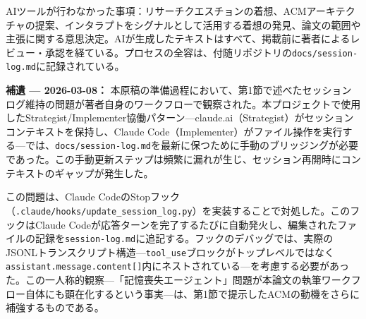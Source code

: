\documentclass[conference]{IEEEtran}
\begin{document}
AIツールが行わなかった事項：リサーチクエスチョンの着想、ACMアーキテクチャの提案、インタラプトをシグナルとして活用する着想の発見、論文の範囲や主張に関する意思決定。AIが生成したテキストはすべて、掲載前に著者によるレビュー・承認を経ている。プロセスの全容は、付随リポジトリの\texttt{docs/session-log.md}に記録されている。

\textbf{補遺 --- 2026-03-08：}
本原稿の準備過程において、第1節で述べたセッションログ維持の問題が著者自身のワークフローで観察された。本プロジェクトで使用したStrategist/Implementer協働パターン---claude.ai（Strategist）がセッションコンテキストを保持し、Claude Code（Implementer）がファイル操作を実行する---では、\texttt{docs/session-log.md}を最新に保つために手動のブリッジングが必要であった。この手動更新ステップは頻繁に漏れが生じ、セッション再開時にコンテキストのギャップが発生した。

この問題は、Claude CodeのStopフック（\texttt{.claude/hooks/update\_session\_log.py}）を実装することで対処した。このフックはClaude Codeが応答ターンを完了するたびに自動発火し、編集されたファイルの記録を\texttt{session-log.md}に追記する。フックのデバッグでは、実際のJSONLトランスクリプト構造---\texttt{tool\_use}ブロックがトップレベルではなく\texttt{assistant.message.content[]}内にネストされている---を考慮する必要があった。この一人称的観察---「記憶喪失エージェント」問題が本論文の執筆ワークフロー自体にも顕在化するという事実---は、第1節で提示したACMの動機をさらに補強するものである。



\end{document}
